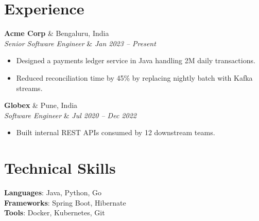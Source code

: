 \documentclass[letterpaper,11pt]{article}
\newcommand{\resumeItem}[1]{\item\small{#1 \vspace{-2pt}}}
\newcommand{\resumeSubheading}[4]{\item\small{\textbf{#1} & #2 \\ \textit{#3} & \textit{#4}}}
\newcommand{\resumeItemListStart}{\begin{itemize}}
\newcommand{\resumeItemListEnd}{\end{itemize}}
\begin{document}
\section{Experience}
  \resumeSubheading{Acme Corp}{Bengaluru, India}{Senior Software Engineer}{Jan 2023 -- Present}
  \resumeItemListStart
    \resumeItem{Designed a payments ledger service in Java handling 2M daily transactions.}
    \resumeItem{Reduced reconciliation time by 45\% by replacing nightly batch with Kafka streams.}
  \resumeItemListEnd

  \resumeSubheading{Globex}{Pune, India}{Software Engineer}{Jul 2020 -- Dec 2022}
  \resumeItemListStart
    \resumeItem{Built internal REST APIs consumed by 12 downstream teams.}
  \resumeItemListEnd

\section{Technical Skills}
 \begin{itemize}[leftmargin=0.15in, label={}]
    \small{\item{
     \textbf{Languages}{: Java, Python, Go} \\
     \textbf{Frameworks}{: Spring Boot, Hibernate} \\
     \textbf{Tools}{: Docker, Kubernetes, Git} \\
    }}
 \end{itemize}
\end{document}
